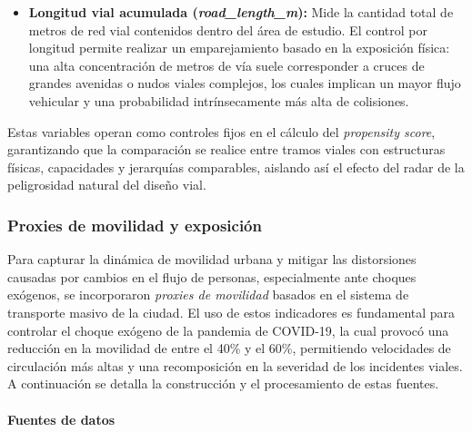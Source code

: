 \begin{itemize}
    \item \textbf{Longitud vial acumulada (\textit{road\_length\_m}):} 
    Mide la cantidad total de metros de red vial contenidos dentro del área de estudio. El control por longitud permite realizar un emparejamiento basado en la exposición física: una alta concentración de metros de vía suele corresponder a cruces de grandes avenidas o nudos viales complejos, los cuales implican un mayor flujo vehicular y una probabilidad intrínsecamente más alta de colisiones.
\end{itemize}

Estas variables operan como controles fijos en el cálculo del \textit{propensity score}, garantizando que la comparación se realice entre tramos viales con estructuras físicas, capacidades y jerarquías comparables, aislando así el efecto del radar de la peligrosidad natural del diseño vial.

\subsubsection{Proxies de movilidad y exposición}

Para capturar la dinámica de movilidad urbana y mitigar las distorsiones causadas por cambios en el flujo de personas, especialmente ante choques exógenos, se incorporaron \textit{proxies de movilidad} basados en el sistema de transporte masivo de la ciudad. El uso de estos indicadores es fundamental para controlar el choque exógeno de la pandemia de COVID-19, la cual provocó una reducción en la movilidad de entre el 40\% y el 60\%, permitiendo velocidades de circulación más altas y una recomposición en la severidad de los incidentes viales. A continuación se detalla la construcción y el procesamiento de estas fuentes.

\paragraph{Fuentes de datos}

